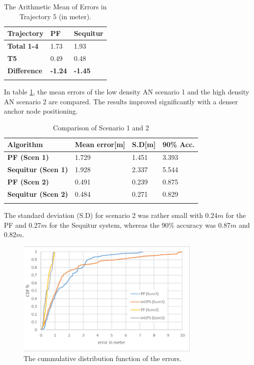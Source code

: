 \begin{table}
\caption{The Arithmetic Mean of Errors in Trajectory 5 (in meter).}
\label{tab:arithmetic_errors_trajectory5}
\centering
\begin{tabular}{l l l}
\toprule
\textbf{Trajectory} & \textbf{PF} & \textbf{Sequitur}\\
\midrule
\textbf{Total 1-4} & 1.73 & 1.93\\
\textbf{T5} & 0.49 & 0.48\\
\midrule
\textbf{Difference}  & \textbf{-1.24} & \textbf{-1.45}\\
\bottomrule\\
\end{tabular}
\end{table}
In table \ref{tab:arithmetic_errors_trajectory5}, the mean errors of the low density AN scenario 1 and the high density AN scenario 2 are compared. The results improved significantly with a denser anchor node positioning. 
\begin{table}
\caption{Comparison of Scenario 1 and 2}
\label{tab:results_trajectory5}
\centering
\begin{tabular}{l l l l}
\toprule
\textbf{Algorithm} & \textbf{Mean error}[m] & \textbf{S.D}[m] & \textbf{90\% Acc.}\\
\midrule
\textbf{PF (Scen 1)} & 1.729 & 1.451 & 3.393\\
\textbf{Sequitur (Scen 1)} & 1.928 & 2.337 & 5.544\\
\midrule
\textbf{PF (Scen 2)} & 0.491 & 0.239 & 0.875\\
\textbf{Sequitur (Scen 2)} & 0.484 & 0.271 & 0.829\\
\bottomrule\\
\end{tabular}
\end{table}
The standard deviation (S.D) for scenario 2 was rather small with $0.24m$ for the PF and $0.27m$ for the Sequitur system, whereas the 90\% accuracy was $0.87m$ and $0.82m$. 
\begin{figure}[th]
\centering
\includegraphics[width=0.8\textwidth]{Figures/cdf_all}
\decoRule
\caption[CDF Scenario 1 and 2]{The cummulative distribution function of the errors.}
\label{fig:cdf_all}
\end{figure}

